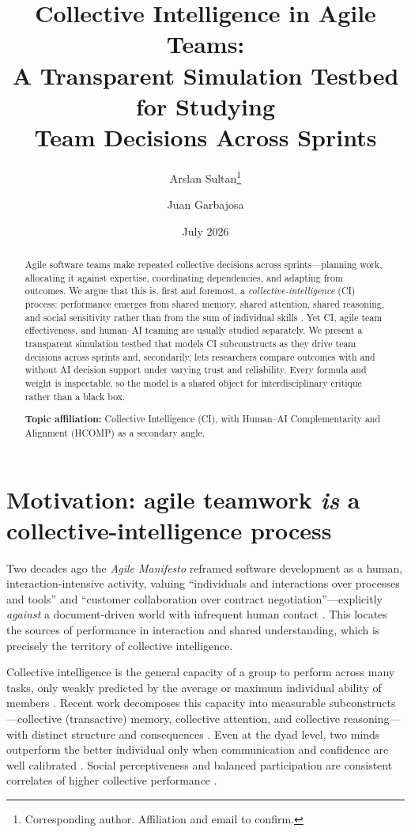 \documentclass{article}
\title{Collective Intelligence in Agile Teams:\\ A Transparent Simulation Testbed for Studying\\ Team Decisions Across Sprints}
\author{Arslan Sultan\thanks{Corresponding author. Affiliation and email to confirm.} \and Juan Garbajosa}
\date{July 2026}
\begin{document}
\maketitle

\begin{abstract}
Agile software teams make repeated collective decisions across sprints---planning work, allocating it against expertise, coordinating dependencies, and adapting from outcomes. We argue that this is, first and foremost, a \emph{collective-intelligence} (CI) process: performance emerges from shared memory, shared attention, shared reasoning, and social sensitivity rather than from the sum of individual skills \citep{Woolley2010,Riedl2021,kommol2025structure}. Yet CI, agile team effectiveness, and human--AI teaming are usually studied separately. We present a transparent simulation testbed that models CI subconstructs as they drive team decisions across sprints and, secondarily, lets researchers compare outcomes with and without AI decision support under varying trust and reliability. Every formula and weight is inspectable, so the model is a shared object for interdisciplinary critique rather than a black box.

\textbf{Topic affiliation:} Collective Intelligence (CI), with Human--AI Complementarity and Alignment (HCOMP) as a secondary angle.
\end{abstract}

\section{Motivation: agile teamwork \emph{is} a collective-intelligence process}

Two decades ago the \emph{Agile Manifesto} reframed software development as a human, interaction-intensive activity, valuing ``individuals and interactions over processes and tools'' and ``customer collaboration over contract negotiation''---explicitly \emph{against} a document-driven world with infrequent human contact \citep{Beck2001}. This locates the sources of performance in interaction and shared understanding, which is precisely the territory of collective intelligence.

Collective intelligence is the general capacity of a group to perform across many tasks, only weakly predicted by the average or maximum individual ability of members \citep{Woolley2010}. Recent work decomposes this capacity into measurable subconstructs---collective (transactive) memory, collective attention, and collective reasoning---with distinct structure and consequences \citep{kommol2025structure,Riedl2021}. Even at the dyad level, two minds outperform the better individual only when communication and confidence are well calibrated \citep{Bahrami2010}. Social perceptiveness and balanced participation are consistent correlates of higher collective performance \citep{Woolley2010,woolley2025teams}.
\end{document}
